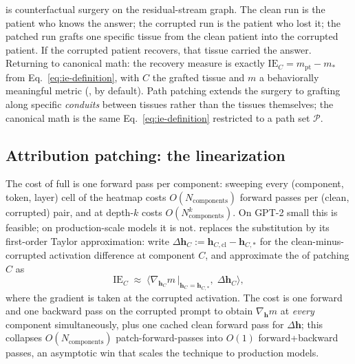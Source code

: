 \begin{intuition}
 is counterfactual surgery on the residual-stream
graph. The clean run is the patient who knows the answer; the
corrupted run is the patient who lost it; the patched run grafts one
specific tissue from the clean patient into the corrupted patient. If
the corrupted patient recovers, that tissue carried the answer.
Returning to canonical math: the recovery measure is exactly
$\mathrm{IE}_C = m_{\text{pt}} - m_{*}$ from
Eq.~\eqref{eq:ie-definition}, with $C$ the grafted tissue and $m$ a
behaviorally meaningful metric (, by default). Path
patching extends the surgery to grafting along specific
\emph{conduits} between tissues rather than the tissues themselves;
the canonical math is the same Eq.~\eqref{eq:ie-definition} restricted
to a path set $\mathcal{P}$.
\end{intuition}

\subsection{Attribution patching: the linearization}
\label{sec:patching-attribution}

The cost of full  is one forward pass per component:
sweeping every (component, token, layer) cell of the heatmap costs
$O(N_{\text{components}})$ forward passes per (clean, corrupted) pair,
and  at depth-$k$ costs $O(N_{\text{components}}^{k})$.
On GPT-2 small this is feasible; on production-scale models it is not.
\emph{} replaces the substitution by its first-order
Taylor approximation: write
$\Delta\mathbf{h}_C := \mathbf{h}_{C,\text{cl}} -
\mathbf{h}_{C,*}$ for the clean-minus-corrupted activation difference at
component $C$, and approximate the  of patching $C$ as
\begin{equation}
  \mathrm{IE}_C
  \;\approx\;
  \big\langle \nabla_{\mathbf{h}_C} m \,\big|_{\mathbf{h}_C =
  \mathbf{h}_{C,*}},\;
  \Delta\mathbf{h}_C \big\rangle,
  \label{eq:attribution-patching}
\end{equation}
where the gradient is taken at the corrupted activation. The cost is
one forward and one backward pass on the corrupted prompt to obtain
$\nabla_{\mathbf{h}} m$ at \emph{every} component simultaneously, plus
one cached clean forward pass for $\Delta\mathbf{h}$; this collapses
$O(N_{\text{components}})$ patch-forward-passes into $O(1)$
forward+backward passes, an asymptotic win that scales the technique
to production models.

